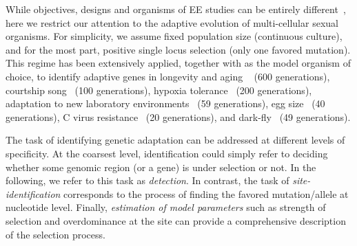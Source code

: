 While objectives, designs and organisms of EE studies can be entirely 
different~\cite{Barrick2013Genome,schlotterer2015combining}, here we 
restrict our attention to the adaptive evolution of multi-cellular sexual 
organisms. 
For simplicity, we assume fixed population size (continuous culture), and
for the most part, positive single locus selection (only one favored
mutation). This regime has been extensively applied, together with
\dmel as the model organism of choice, to identify adaptive 
genes in longevity and aging
~\cite{burke2010genome,remolina2012genomic} (600 generations),
courtship song~\cite{turner2011population} (100 generations), 
hypoxia tolerance~\cite{zhou2011experimental} (200 generations), 
adaptation to new laboratory 
environments~\cite{orozco2012adaptation,tobler2014massive} (59
generations), 
egg size~\cite{jha2015whole} (40 generations), 
C virus resistance~\cite{martins2014host} (20 generations), and
dark-fly~\cite{izutsu2015dynamics} (49 generations). 


The task of identifying genetic adaptation can be addressed at different levels 
of specificity. At the coarsest level, identification could simply refer
to deciding whether some genomic region (or a gene) is under selection or 
not. In
the following, we refer to this task as \emph{detection}. In contrast,
the task of \emph{site-identification} corresponds to the process of
finding the favored mutation/allele at nucleotide level. Finally, \emph{estimation
 of model parameters} such as strength of selection and overdominance
at the site can provide a comprehensive description of the selection
process.

